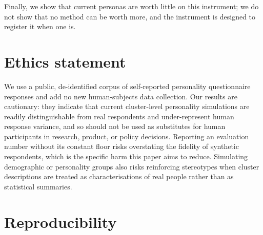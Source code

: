 \documentclass[11pt]{article}
\begin{document}
Finally, we show that current personas are worth little on this instrument; we do
not show that no method can be worth more, and the instrument is designed to
register it when one is.

\section*{Ethics statement}

We use a public, de-identified corpus of self-reported personality questionnaire
responses and add no new human-subjects data collection. Our results are
cautionary: they indicate that current cluster-level personality simulations are
readily distinguishable from real respondents and under-represent human response
variance, and so should not be used as substitutes for human participants in
research, product, or policy decisions. Reporting an evaluation number without
its constant floor risks overstating the fidelity of synthetic respondents, which
is the specific harm this paper aims to reduce. Simulating demographic or
personality groups also risks reinforcing stereotypes when cluster descriptions
are treated as characterisations of real people rather than as statistical
summaries.


\appendix

\section{Reproducibility}
\end{document}
